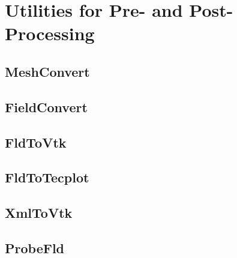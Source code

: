\chapter{Utilities for Pre- and Post-Processing}

\section{MeshConvert}

\section{FieldConvert}

\section{FldToVtk}

\section{FldToTecplot}

\section{XmlToVtk}

\section{ProbeFld}
